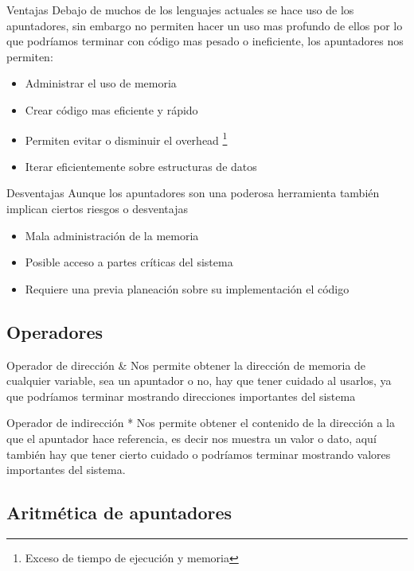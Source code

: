 \documentclass{beamer}
\begin{document}
\begin{frame}{Ventajas}
	Debajo de muchos de los lenguajes actuales se hace uso de los apuntadores, sin embargo no permiten hacer un uso mas profundo de ellos por lo que podr\'iamos terminar con c\'odigo mas pesado o ineficiente, los apuntadores nos permiten:
	\begin{itemize}
		\item Administrar el uso de memoria
		\item Crear c\'odigo mas eficiente y r\'apido
		\item Permiten evitar o disminuir el overhead \footnote{Exceso de tiempo de ejecuci\'on y memoria}
		\item Iterar eficientemente sobre estructuras de datos 
	\end{itemize}
\end{frame}

\begin{frame}{Desventajas}
	Aunque los apuntadores son una poderosa herramienta tambi\'en implican ciertos riesgos o desventajas
	\begin{itemize}
		\item Mala administraci\'on de la memoria
		\item Posible acceso a partes cr\'iticas del sistema
		\item Requiere una previa planeaci\'on sobre su implementaci\'on el c\'odigo
	\end{itemize}
\end{frame}

\subsection{Operadores}
\begin{frame}{Operador de direcci\'on \&}
	Nos permite obtener la direcci\'on de memoria de cualquier variable, sea un apuntador o no, hay que tener cuidado al usarlos, ya que podr\'iamos terminar mostrando direcciones importantes del sistema
\end{frame}

\begin{frame}{Operador de indirecci\'on *}
	Nos permite obtener el contenido de la direcci\'on a la que el apuntador hace referencia, es decir nos muestra un valor o dato, aqu\'i tambi\'en hay que tener cierto cuidado o podr\'iamos terminar mostrando valores importantes del sistema.
\end{frame}

\subsection{Aritm\'etica de apuntadores}
\end{document}
